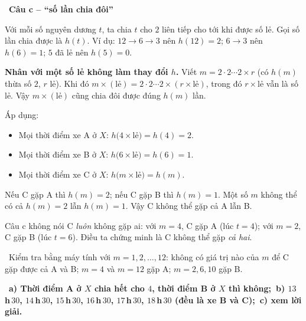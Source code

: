 \documentclass[11pt]{article}
\providecommand{\AnsWord}{Đáp số}
\newcommand{\ans}[1]{\par\smallskip{\bfseries\color{tmGreen!88!black}\AnsWord:}\ {\bfseries\color{AnsRed}#1}\par}
\newcommand{\step}[2]{\par\smallskip\noindent{\bfseries\color{tmBlue!85!black}\StepWord~#1.}\ {\bfseries #2}\par\nopagebreak}
\newcommand{\verify}[1]{\par\smallskip\noindent{\bfseries\color{tmGreen!80!black}\faCheckCircle\ \CheckWord}\ #1\par}
\def\AnsWord{Đáp số}
\def\StepWord{Bước}
\def\CheckWord{Thử lại:}
\begin{document}
{\step{3}{Câu c -- ``số lần chia đôi''}
Với mỗi số nguyên dương $t$, ta chia $t$ cho $2$ liên tiếp cho tới khi được số lẻ. Gọi số lần chia được là $h(t)$. Ví dụ: $12\to 6\to 3$ nên $h(12)=2$; $6\to3$ nên $h(6)=1$; $5$ đã lẻ nên $h(5)=0$.
\begin{proofbox}\textbf{Nhân với một số lẻ không làm thay đổi $h$.} Viết $m=2\cdot2\cdots2\times r$ (có $h(m)$ thừa số $2$, $r$ lẻ). Khi đó $m\times(\text{lẻ})=2\cdot2\cdots2\times(r\times\text{lẻ})$, trong đó $r\times\text{lẻ}$ vẫn là số lẻ. Vậy $m\times(\text{lẻ})$ cũng chia đôi được đúng $h(m)$ lần.\end{proofbox}
Áp dụng:
\begin{itemize}[leftmargin=1.3em,itemsep=1pt]
\item Mọi thời điểm xe A ở $X$: $h\big(4\times\text{lẻ}\big)=h(4)=2$.
\item Mọi thời điểm xe B ở $X$: $h\big(6\times\text{lẻ}\big)=h(6)=1$.
\item Mọi thời điểm xe C ở $X$: $h\big(m\times\text{lẻ}\big)=h(m)$.
\end{itemize}
Nếu C gặp A thì $h(m)=2$; nếu C gặp B thì $h(m)=1$. Một số $m$ không thể có cả $h(m)=2$ lẫn $h(m)=1$. Vậy C không thể gặp cả A lẫn B.
\begin{warnbox}Câu c không nói C \emph{luôn} không gặp ai: với $m=4$, C gặp A (lúc $t=4$); với $m=2$, C gặp B (lúc $t=6$). Điều ta chứng minh là C không thể gặp \emph{cả hai}.\end{warnbox}
\verify{Kiểm tra bằng máy tính với $m=1,2,\dots,12$: không có giá trị nào của $m$ để C gặp được cả A và B; $m=4$ và $m=12$ gặp A; $m=2,6,10$ gặp B.}
\ans{a) Thời điểm A ở $X$ chia hết cho $4$, thời điểm B ở $X$ thì không;\ b) $13$\,h\,$30$, $14$\,h\,$30$, $15$\,h\,$30$, $16$\,h\,$30$, $17$\,h\,$30$, $18$\,h\,$30$ (đều là xe B và C);\ c) xem lời giải.}
}
\end{document}
